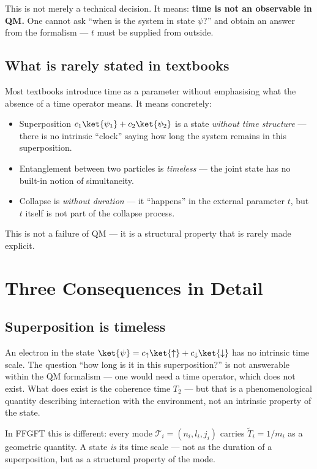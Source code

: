 This is not merely a technical decision. It means:
\textbf{time is not an observable in QM.} One cannot ask ``when is
the system in state $\psi$?'' and obtain an answer from the formalism
— $t$ must be supplied from outside.

\subsection{What is rarely stated in textbooks}

Most textbooks introduce time as a parameter without emphasising what
the absence of a time operator means. It means concretely:

\begin{itemize}
  \item Superposition $c_1\ket{\psi_1}+c_2\ket{\psi_2}$ is a state
    \emph{without time structure} — there is no intrinsic ``clock''
    saying how long the system remains in this superposition.
  \item Entanglement between two particles is \emph{timeless} — the
    joint state has no built-in notion of simultaneity.
  \item Collapse is \emph{without duration} — it ``happens'' in the
    external parameter $t$, but $t$ itself is not part of the collapse
    process.
\end{itemize}

This is not a failure of QM — it is a structural property that is
rarely made explicit.

\section{Three Consequences in Detail}

\subsection{Superposition is timeless}

An electron in the state
$\ket{\psi} = c_\uparrow\ket{\uparrow} + c_\downarrow\ket{\downarrow}$
has no intrinsic time scale. The question ``how long is it in this
superposition?'' is not answerable within the QM formalism — one
would need a time operator, which does not exist. What does exist is
the coherence time $T_2$ — but that is a phenomenological quantity
describing interaction with the environment, not an intrinsic
property of the state.

In FFGFT this is different: every mode $\mathcal{T}_i=(n_i,l_i,j_i)$
carries $\tilde{T}_i=1/m_i$ as a geometric quantity. A state
\emph{is} its time scale — not as the duration of a superposition,
but as a structural property of the mode.


